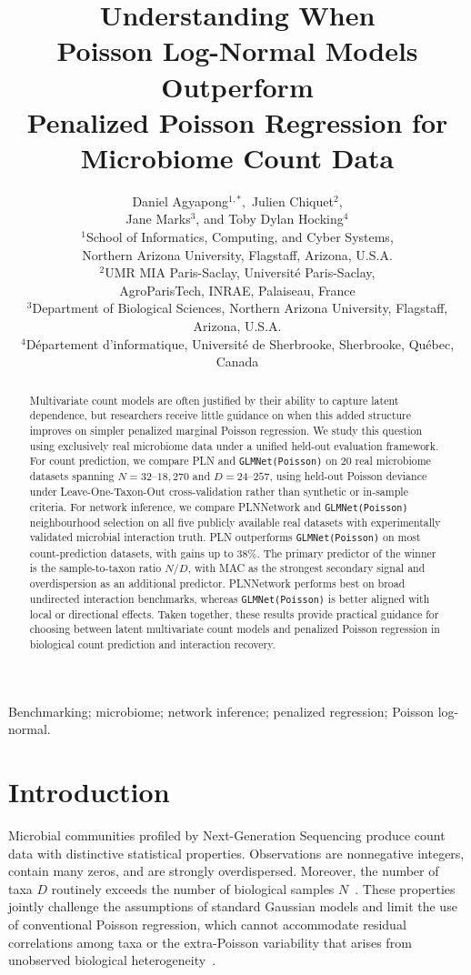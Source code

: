 \documentclass[useAMS,usenatbib,referee]{biom}
\title[When Do PLN Models Beat Penalized Poisson Models?]{Understanding When\\ Poisson Log-Normal Models Outperform\\ Penalized Poisson Regression for Microbiome Count Data}
\author{Daniel Agyapong$^{1,*}$\email{da2343@nau.edu}$,$ Julien Chiquet$^{2}$,\\ Jane Marks$^{3}$, and Toby Dylan Hocking$^{4}$\\
$^{1}$School of Informatics, Computing, and Cyber Systems,\\ Northern Arizona University, Flagstaff, Arizona, U.S.A.\\
$^{2}$UMR MIA Paris-Saclay, Universit\'{e} Paris-Saclay,\\ AgroParisTech, INRAE, Palaiseau, France\\
$^{3}$Department of Biological Sciences, Northern Arizona University, Flagstaff, Arizona, U.S.A.\\
$^{4}$D\'{e}partement d'informatique, Universit\'{e} de Sherbrooke, Sherbrooke, Qu\'{e}bec, Canada}
\begin{document}
\label{firstpage}

\begin{abstract}
Multivariate count models are often justified by their ability to capture latent dependence, but researchers receive little guidance on when this added structure improves on simpler penalized marginal Poisson regression.
We study this question using exclusively real microbiome data under a unified held-out evaluation framework.
For count prediction, we compare PLN and \texttt{GLMNet(Poisson)} on 20 real microbiome datasets spanning $N = 32$--$18{,}270$ and $D = 24$--$257$, using held-out Poisson deviance under Leave-One-Taxon-Out cross-validation rather than synthetic or in-sample criteria.
For network inference, we compare PLNNetwork and \texttt{GLMNet(Poisson)} neighbourhood selection on all five publicly available real datasets with experimentally validated microbial interaction truth.
PLN outperforms \texttt{GLMNet(Poisson)} on most count-prediction datasets, with gains up to 38\%.
The primary predictor of the winner is the sample-to-taxon ratio $N/D$, with MAC as the strongest secondary signal and overdispersion as an additional predictor.
PLNNetwork performs best on broad undirected interaction benchmarks, whereas \texttt{GLMNet(Poisson)} is better aligned with local or directional effects.
Taken together, these results provide practical guidance for choosing between latent multivariate count models and penalized Poisson regression in biological count prediction and interaction recovery.
\end{abstract}

\begin{keywords}
Benchmarking; microbiome; network inference; penalized regression; Poisson log-normal.
\end{keywords}

\maketitle

\section{Introduction}
Microbial communities profiled by Next-Generation Sequencing produce count data with distinctive statistical properties.
Observations are nonnegative integers, contain many zeros, and are strongly overdispersed.
Moreover, the number of taxa $D$ routinely exceeds the number of biological samples $N$~\citep{Kodikara2022}.
These properties jointly challenge the assumptions of standard Gaussian models and limit the use of conventional Poisson regression, which cannot accommodate residual correlations among taxa or the extra-Poisson variability that arises from unobserved biological heterogeneity~\citep{mcmurdie2014waste, Chiquet2021}.
\end{document}
